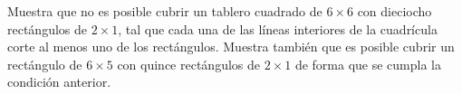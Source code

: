 Muestra que no es posible cubrir un tablero cuadrado de $6\times 6$ con dieciocho rectángulos de $2\times 1$, tal que cada una de las líneas interiores de la cuadrícula corte al menos uno de los rectángulos. Muestra también que es posible cubrir un rectángulo de $6\times 5$ con quince rectángulos de $2\times 1$ de forma que se cumpla la condición anterior. 